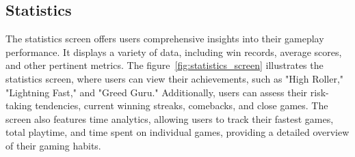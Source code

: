\subsection{Statistics}

The statistics screen offers users comprehensive insights into their gameplay performance. It displays a variety of data, including win records, average scores, and other pertinent metrics. The figure~\ref{fig:statistics_screen} illustrates the statistics screen, where users can view their achievements, such as "High Roller," "Lightning Fast," and "Greed Guru." Additionally, users can assess their risk-taking tendencies, current winning streaks, comebacks, and close games. The screen also features time analytics, allowing users to track their fastest games, total playtime, and time spent on individual games, providing a detailed overview of their gaming habits.
